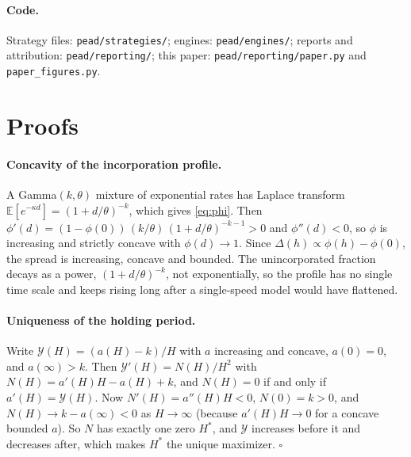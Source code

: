 \documentclass[11pt]{article}
\theoremstyle{definition}
\newcommand{\E}{\mathbb{E}}
\newcommand{\1}{\mathbf{1}}
\begin{document}
\paragraph{Code.} Strategy files: \texttt{pead/strategies/}; engines: \texttt{pead/engines/}; reports and attribution: \texttt{pead/reporting/}; this paper: \texttt{pead/reporting/paper.py} and \texttt{paper\_figures.py}.

\section{Proofs}\label{app:proofs}

\paragraph{Concavity of the incorporation profile.}
A Gamma$(k,\theta)$ mixture of exponential rates has Laplace transform $\E[e^{-\kappa d}]=(1+d/\theta)^{-k}$, which gives \eqref{eq:phi}. Then
$\phi'(d)=(1-\phi(0))\,(k/\theta)\,(1+d/\theta)^{-k-1}>0$ and $\phi''(d)<0$, so $\phi$ is increasing and strictly concave with $\phi(d)\to1$. Since $\Delta(h)\propto\phi(h)-\phi(0)$, the spread is increasing, concave and
bounded. The unincorporated fraction decays as a power, $(1+d/\theta)^{-k}$, not exponentially, so the profile has no single time scale and keeps rising long after a single-speed model would have flattened.

\paragraph{Uniqueness of the holding period.}
Write $\mathcal Y(H)=(a(H)-k)/H$ with $a$ increasing and concave, $a(0)=0$, and $a(\infty)>k$. Then $\mathcal Y'(H)=N(H)/H^2$ with $N(H)=a'(H)H-a(H)+k$, and $N(H)=0$ if and only if $a'(H)=\mathcal Y(H)$. Now
$N'(H)=a''(H)H<0$, $N(0)=k>0$, and $N(H)\to k-a(\infty)<0$ as $H\to\infty$ (because $a'(H)H\to0$ for a concave bounded $a$). So $N$ has exactly one zero $H^\ast$, and $\mathcal Y$ increases before it and decreases after,
which makes $H^\ast$ the unique maximizer. $\square$
\end{document}
